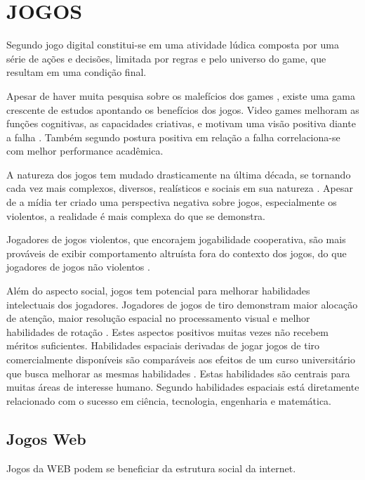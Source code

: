 \section{JOGOS}
Segundo \autocite{indieGamesLemes} jogo digital constitui-se em uma
atividade lúdica composta por uma série de ações e decisões,
limitada por regras e pelo universo do game, que resultam em uma
condição final.

Apesar de haver muita pesquisa sobre os malefícios dos games , existe
uma gama crescente de estudos apontando os benefícios dos jogos. Video
games melhoram as funções cognitivas, as capacidades criativas, e
motivam uma visão positiva diante a falha \autocite{gamebenefits}.
Também segundo \autocite{gamebenefits} postura positiva em relação a
falha correlaciona-se com melhor performance acadêmica.

A natureza dos jogos tem mudado drasticamente na última década, se
tornando cada vez mais complexos, diversos, realísticos e sociais em
sua natureza \autocite{gamebenefits}. Apesar de a mídia ter criado
uma perspectiva negativa sobre jogos, especialmente os violentos, a
realidade é mais complexa do que se demonstra.

Jogadores de jogos violentos, que encorajem jogabilidade cooperativa,
são mais prováveis de exibir comportamento altruísta fora do
contexto dos jogos, do que jogadores de jogos não violentos
\autocite{gamebenefits}.

Além do aspecto social, jogos tem potencial para melhorar habilidades
intelectuais dos jogadores. Jogadores de jogos de tiro demonstram maior
alocação de atenção, maior resolução espacial no processamento
visual e melhor habilidades de rotação \autocite{gamebenefits}. Estes
aspectos positivos muitas vezes não recebem méritos suficientes.
Habilidades espaciais derivadas de jogar jogos de tiro comercialmente
disponíveis são comparáveis aos efeitos de um curso universitário
que busca melhorar as mesmas habilidades \autocite{gamebenefits}. Estas
habilidades são centrais para muitas áreas de interesse humano.
Segundo \autocite{gamebenefits} habilidades espaciais está diretamente
relacionado com o sucesso em ciência, tecnologia, engenharia e
matemática.

\subsection{Jogos Web}

Jogos da WEB podem se beneficiar da estrutura social da internet.

